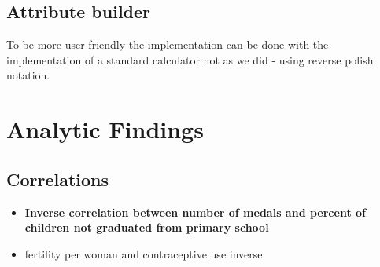 \documentclass[a4paper]{article}
\begin{document}
\subsection{Attribute builder} To be more user friendly the implementation can be done with the implementation of a standard calculator not as we did - using reverse polish notation.


\section{Analytic Findings}
\subsection{Correlations}
\begin{itemize}
\item{\textbf{Inverse correlation between number of medals and percent of children not graduated from primary school}}
\item{fertility per woman and contraceptive use inverse}
\end{itemize}
\end{document}
